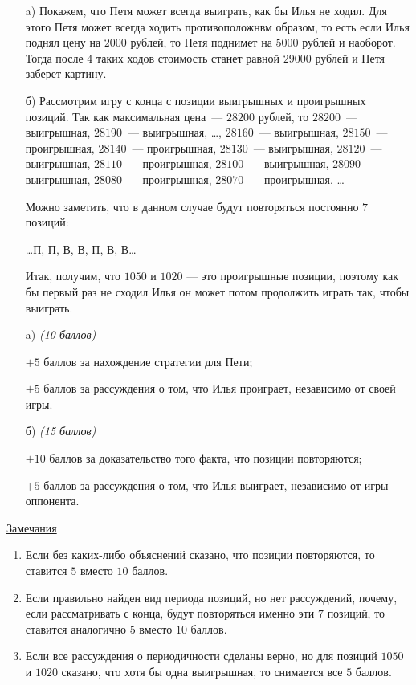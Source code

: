 \solutionSection
\begin{enumerate}
    \item[a)] Покажем, что Петя может всегда выиграть, как бы 
	Илья не ходил. Для этого Петя может всегда ходить противоположнвм образом,
	то есть если Илья поднял цену на $2000$ рублей, то Петя поднимет на $5000$
	рублей и наоборот. Тогда после $4$ таких ходов стоимость станет равной 
	$29000$ рублей и Петя заберет картину.
	
	\item[б)]  Рассмотрим игру с конца с позиции выигрышных и проигрышных позиций. Так как максимальная цена~--- $28200$ рублей, то
	$28200$~--- выигрышная, $28190$~--- выигрышная, \dots, $28160$~--- выигрышная, 
	$28150$~--- проигрышная, $28140$~--- проигрышная, $28130$~--- выигрышная,
	$28120$~--- выигрышная, $28110$~--- проигрышная, $28100$~--- выигрышная,
	$28090$~--- выигрышная, $28080$~--- проигрышная, $28070$~--- проигрышная, \dots
	
    Можно заметить, что в данном случае будут повторяться постоянно $7$ позиций:
    
    \begin{center}	
	    \dots П, П, В, В, П, В, В\dots 
    \end{center}

	Итак, получим, что $1050$ и $1020$ --- это проигрышные позиции, поэтому 
	как бы первый раз не сходил Илья он может потом продолжить играть так,
	чтобы выиграть.
\end{enumerate}	


\additionalCriteria

\begin{enumerate}
    \item[a)] \textit{(10 баллов)} 

	$+5$ баллов за нахождение стратегии для Пети;
	
	$+5$ баллов за рассуждения о том, что Илья проиграет, независимо от своей игры.

	\item[б)]  \textit{(15 баллов)} 
	
	$+10$ баллов за доказательство того факта, что позиции повторяются;
	
	$+5$ баллов за рассуждения о том, что Илья выиграет, независимо от игры оппонента.
\end{enumerate}
	
\underline{Замечания} 
\begin{enumerate}
	\item Если без каких-либо объяснений сказано, что позиции повторяются, то
	ставится $5$ вместо $10$ баллов.
	
	\item Если правильно найден вид периода позиций, но нет рассуждений, 
	почему, если рассматривать с конца, будут повторяться именно эти $7$ позиций,
	то ставится аналогично $5$ вместо $10$ баллов.
	
	\item Если все рассуждения о периодичности сделаны верно, но 
	для позиций $1050$ и $1020$ сказано, что хотя бы одна выигрышная,
	то снимается все $5$ баллов.  
\end{enumerate}
